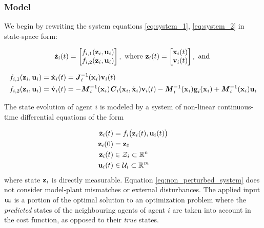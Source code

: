 \subsubsection{Model}

We begin by rewriting the system equations \eqref{eq:system_1},
\eqref{eq:system_2} in state-space form:

\begin{align}
  \dot{\bm{\mathbf{z}}}_i(t) =
    \begin{bmatrix}
      f_{i,1}(\bm{\mathbf{z}}_i, \bm{\mathbf{u}}_i) \\
      f_{i,2}(\bm{\mathbf{z}}_i, \bm{\mathbf{u}}_i) \\
    \end{bmatrix}, \text{ where }
  \bm{\mathbf{z}}_i(t) =
    \begin{bmatrix}
      \bm{\mathbf{x}}_i(t) \\
      \bm{\mathbf{v}}_i(t) \\
    \end{bmatrix}, \text{ and }
\end{align}

\begin{align}
  f_{i,1}(\bm{\mathbf{z}}_i, \bm{\mathbf{u}}_i) &=
  \dot{\bm{\mathbf{x}}}_i(t) = \bm{\mathit{J}}_i^{-1}(\bm{\mathbf{x}}_i) \bm{\mathbf{v}}_i(t) \\
  f_{i,2}(\bm{\mathbf{z}}_i, \bm{\mathbf{u}}_i) &=
  \dot{\bm{\mathbf{v}}}_i(t) = -\bm{\mathit{M}}_i^{-1}(\bm{\mathbf{x}}_i)\bm{\mathit{C}}_i(\bm{\mathbf{x}}_i,\dot{\bm{\mathbf{x}}}_i) \bm{\mathbf{v}}_i(t)
    - \bm{\mathit{M}}_i^{-1}(\bm{\mathbf{x}}_i)\bm{\mathbf{g}}_i(\bm{\mathbf{x}}_i)
    + \bm{\mathit{M}}_i^{-1}(\bm{\mathbf{x}}_i)\bm{\mathbf{u}}_i
\label{eq:system}
\end{align}

The state evolution of agent $i$ is modeled by a system of non-linear
continuous-time differential equations of the form

\begin{align}
  \dot{\bm{\mathbf{z}}}_i(t) &= f_i \big(\bm{\mathbf{z}}_i (t), \bm{\mathbf{u}}_i (t)\big) \label{eq:non_perturbed_system}\\
  \bm{\mathbf{z}}_i(0) &= \bm{\mathbf{z}}_0 \\
  \bm{\mathbf{z}}_i (t) &\in \mathcal{Z}_i \subset \mathbb{R}^n \\
  \bm{\mathbf{u}}_i (t) &\in \mathcal{U}_i \subset \mathbb{R}^m
\end{align}
where state $\bm{\mathbf{z}}_i$ is directly measurable. Equation
\ref{eq:non_perturbed_system} does not consider model-plant mismatches or
external disturbances. The applied input $\bm{\mathbf{u}}_i$ is a portion of the
optimal solution to an optimization problem where the \textit{predicted} states
of the neighbouring agents of agent $i$ are taken into account in the cost
function, as opposed to their \textit{true} states.

